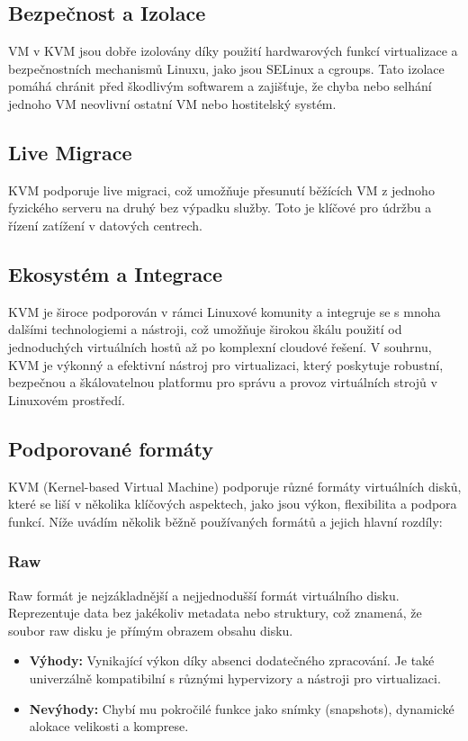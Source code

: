\subsection{Bezpečnost a Izolace}
VM v KVM jsou dobře izolovány díky použití hardwarových funkcí virtualizace a bezpečnostních mechanismů Linuxu, jako jsou SELinux a cgroups.
Tato izolace pomáhá chránit před škodlivým softwarem a zajišťuje, že chyba nebo selhání jednoho VM neovlivní ostatní VM nebo hostitelský systém.

\subsection{Live Migrace}
KVM podporuje live migraci, což umožňuje přesunutí běžících VM z jednoho fyzického serveru na druhý bez výpadku služby. Toto je klíčové pro údržbu a řízení zatížení v datových centrech.

\subsection{Ekosystém a Integrace}
KVM je široce podporován v rámci Linuxové komunity a integruje se s mnoha dalšími technologiemi a nástroji, což umožňuje širokou škálu použití od jednoduchých virtuálních hostů až po komplexní cloudové řešení.
V souhrnu, KVM je výkonný a efektivní nástroj pro virtualizaci, který poskytuje robustní, bezpečnou a škálovatelnou platformu pro správu a provoz virtuálních strojů v Linuxovém prostředí.

\subsection{Podporované formáty}
KVM (Kernel-based Virtual Machine) podporuje různé formáty virtuálních disků, které se liší v několika klíčových aspektech, jako jsou výkon, flexibilita a podpora funkcí. Níže uvádím několik běžně používaných formátů a jejich hlavní rozdíly:

\subsubsection*{Raw}
\noindent
Raw formát je nejzákladnější a nejjednodušší formát virtuálního disku. Reprezentuje data bez jakékoliv metadata nebo struktury, což znamená, že soubor raw disku je přímým obrazem obsahu disku.
\begin{itemize}[label=]
\item \textbf{Výhody:} Vynikající výkon díky absenci dodatečného zpracování. Je také univerzálně kompatibilní s různými hypervizory a nástroji pro virtualizaci.
\item \textbf{Nevýhody:} Chybí mu pokročilé funkce jako snímky (snapshots), dynamické alokace velikosti a komprese.
\end{itemize}
